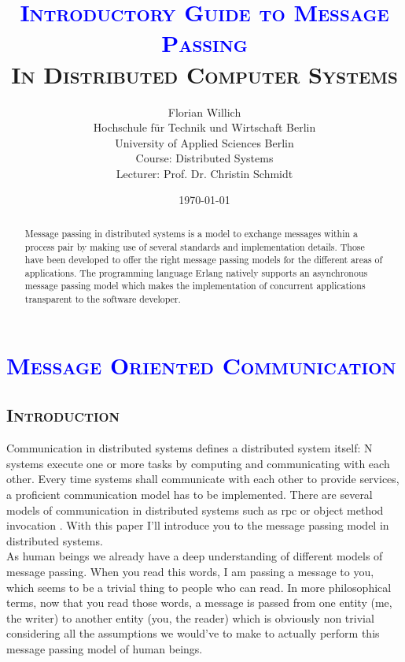 \documentclass[xcolor=dvipsnames]{article}
\title{\scshape{\textbf{\textcolor{blue}{Introductory Guide to Message Passing}}\\In Distributed Computer Systems}}
\author{Florian Willich \\ Hochschule f\"ur Technik und Wirtschaft Berlin \\ University of Applied Sciences Berlin \\ Course: Distributed Systems \\ Lecturer: Prof. Dr. Christin Schmidt}
\date{\today}
\begin{document}
\maketitle

\begin{abstract}

Message passing in distributed systems is a model to exchange messages within a process pair by making use of several standards and implementation details. Those have been developed to offer the right message passing models for the different areas of applications. The programming language Erlang natively supports an asynchronous message passing model which makes the implementation of concurrent applications transparent to the software developer.

\end{abstract}

\tableofcontents

\newpage

\section{\scshape{\textcolor{blue}{Message Oriented Communication}}} \label{introduction}

\subsection{\scshape{Introduction}}

Communication in distributed systems defines a distributed system itself: N systems execute one or more tasks by computing and communicating with each other. Every time systems shall communicate with each other to provide services, a proficient communication model has to be implemented. There are several models of communication in distributed systems such as \gls{rpc} or object method invocation \cite[chap. 4.3 / p. 203]{tanenbaum}. With this paper I'll introduce you to the message passing model in distributed systems.\\

\noindent As human beings we already have a deep understanding of different models of message passing. When you read this words, I am passing a message to you, which seems to be a trivial thing to people who can read. In more philosophical terms, now that you read those words, a message is passed from one entity (me, the writer) to another entity (you, the reader) which is obviously non trivial considering all the assumptions we would've to make to actually perform this message passing model of human beings.\\
\end{document}
